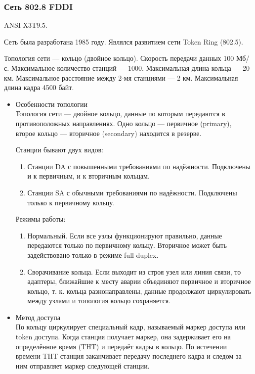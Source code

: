 \documentclass[12pt, russian, oneside, article]{ncc}
\begin{document}
\subsubsection{Сеть 802.8 FDDI}
\label{sec-5_2_2}


ANSI X3T9.5.

Сеть была разработана 1985 году. Являлся развитием сети Token Ring (802.5).

Топология сети --- кольцо (двойное кольцо). Скорость передачи данных 100 Мб/с. Максимальное количество станций --- 1000. Максимальная длина кольца --- 20 км. Максимальное расстояние между 2-мя станциями --- 2 км. Максимальная длина кадра 4500 байт.
\begin{itemize}

\item Особенности топологии\\
\label{sec-5_2_2_1}%
Топология сети --- двойное кольцо, данные по которым передаются в противоположных направлениях. Одно кольцо --- первичное (primary), второе кольцо --- вторичное (secondary) находится в резерве.

Станции бывают двух видов:
\begin{enumerate}
\item Станции DA с повышенными требованиями по надёжности. Подключены и к первичным, и к вторичным кольцам.
\item Станции SA с обычными требованиями по надёжности. Подключены только к первичному кольцу.
\end{enumerate}

Режимы работы:
\begin{enumerate}
\item Нормальный. Если все узлы функционируют правильно, данные передаются только по первичному кольцу. Вторичное может быть задействовано только в режиме full duplex.
\item Сворачивание кольца. Если выходит из строя узел или линия связи, то адаптеры, ближайшие к месту аварии объединяют первичное и вторичное кольцо, т. к. кольца разнонаправлены, данные продолжают циркулировать между узлами и топология кольцо сохраняется.
\end{enumerate}


\item Метод доступа\\
\label{sec-5_2_2_2}%
По кольцу циркулирует специальный кадр, называемый маркер доступа или token доступа. Когда станция получает маркер, она задерживает его на определённое время (THT) и передаёт кадры в кольцо. По истечении времени THT станция заканчивает передачу последнего кадра и следом за ним отправляет маркер следующей станции.


\end{itemize}
\end{document}
